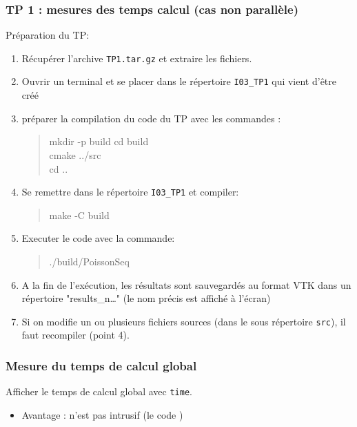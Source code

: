 \documentclass{beamer}
\begin{document}
\begin{frame}
	\frametitle{TP 1 : mesures des temps calcul (cas non parall\`ele)}
	
	Pr\'eparation du TP:
	\vfill
	\begin{enumerate}
		\item R\'ecup\'erer l'archive {\tt TP1.tar.gz} et extraire les fichiers.
		\item Ouvrir un terminal et se placer dans le r\'epertoire {\tt I03\_TP1} qui vient d'\^etre cr\'e\'e
		\item préparer la compilation du code du TP avec les commandes :
		\begin{quote}
			mkdir -p build
			cd build\\
			cmake ../src\\
			cd ..
		\end{quote}
		\item Se remettre dans le r\'epertoire {\tt I03\_TP1} et compiler:
		\begin{quote}
			make -C build
		\end{quote}
	\end{enumerate}
	
\end{frame}
\begin{frame}
	\begin{enumerate}
  		\setcounter{enumi}{4}
		\item Executer le code avec la commande:
		\begin{quote}
			./build/PoissonSeq
		\end{quote}
		\item A la fin de l'exécution, les résultats sont sauvegardés au format VTK dans un répertoire "results\_n\ldots" (le nom précis est affiché à l'écran)

		\item Si on modifie un ou plusieurs fichiers sources (dans le sous r\'epertoire {\tt 	src}), il faut recompiler (point 4).
	\end{enumerate}
\end{frame}
\begin{frame}
	\frametitle{Mesure du temps de calcul global}
	Afficher le temps de calcul global avec {\tt time}.
	
	\begin{itemize}
		\item Avantage : n'est pas intrusif (le code )
	\end{itemize}
\end{frame}
	
\end{document}
